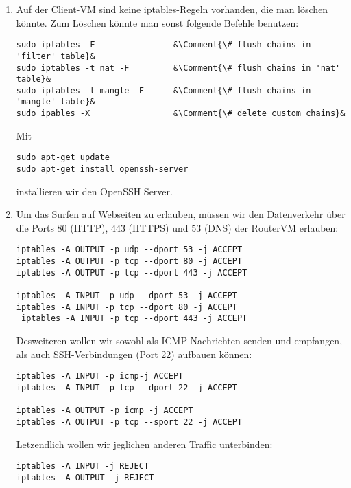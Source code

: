 \documentclass{scrartcl}
\newcommand*{\Comment}[1]{\hfill\makebox[8.0cm][l]{#1}}%
\begin{document}
    \begin{enumerate}[\bfseries 1.]
        \item Auf der Client-VM sind keine iptables-Regeln vorhanden, die man
              löschen könnte. Zum Löschen könnte man sonst folgende Befehle benutzen:

              \begin{lstlisting}[style=BashInputStyle]
sudo iptables -F                &\Comment{\# flush chains in 'filter' table}&
sudo iptables -t nat -F         &\Comment{\# flush chains in 'nat' table}&
sudo iptables -t mangle -F      &\Comment{\# flush chains in 'mangle' table}&
sudo ipables -X                 &\Comment{\# delete custom chains}&
              \end{lstlisting}

              Mit
              \begin{lstlisting}[style=BashInputStyle]
sudo apt-get update
sudo apt-get install openssh-server
              \end{lstlisting}
              installieren wir den OpenSSH Server.

        \item  Um das Surfen auf Webseiten zu erlauben, müssen wir den Datenverkehr über
               die Ports 80 (HTTP), 443 (HTTPS) und 53 (DNS) der RouterVM erlauben:
               \begin{lstlisting}
iptables -A OUTPUT -p udp --dport 53 -j ACCEPT
iptables -A OUTPUT -p tcp --dport 80 -j ACCEPT
iptables -A OUTPUT -p tcp --dport 443 -j ACCEPT

iptables -A INPUT -p udp --dport 53 -j ACCEPT
iptables -A INPUT -p tcp --dport 80 -j ACCEPT
 iptables -A INPUT -p tcp --dport 443 -j ACCEPT
               \end{lstlisting}
               Desweiteren wollen wir sowohl als ICMP-Nachrichten senden und
               empfangen, als auch SSH-Verbindungen (Port 22) aufbauen können:
               \begin{lstlisting}
iptables -A INPUT -p icmp-j ACCEPT
iptables -A INPUT -p tcp --dport 22 -j ACCEPT

iptables -A OUTPUT -p icmp -j ACCEPT
iptables -A OUTPUT -p tcp --sport 22 -j ACCEPT
               \end{lstlisting}
               Letzendlich wollen wir jeglichen anderen Traffic unterbinden:
               \begin{lstlisting}
iptables -A INPUT -j REJECT
iptables -A OUTPUT -j REJECT
               \end{lstlisting}


\end{enumerate}
\end{document}
